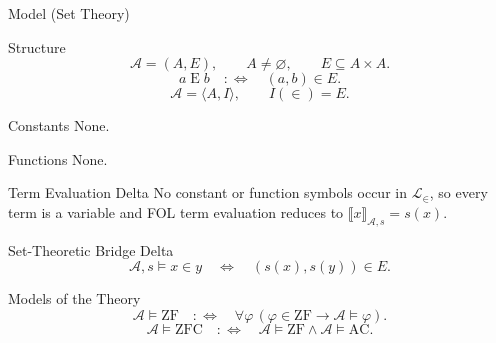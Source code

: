 \documentclass[12pt, a4paper]{report}
\begin{document}
\begin{modelbox}{Model (Set Theory)}
\begin{model}\label{model:set-theory}

\begin{modelcomponent}{Structure}
\[
  \mathcal A=(A,E),
  \qquad
  A\neq\varnothing,
  \qquad
  E\subseteq A\times A.
\]
\[
  a\mathrel E b
  \quad:\Longleftrightarrow\quad
  (a,b)\in E.
\]
\[
  \mathcal A=\langle A,I\rangle,
  \qquad
  I(\in)=E.
\]
\end{modelcomponent}

\begin{modelsorts}
\end{modelsorts}

\begin{modelcomponent}{Constants}
None.
\end{modelcomponent}

\begin{modelcomponent}{Functions}
None.
\end{modelcomponent}

\begin{modelrelations}
\end{modelrelations}

\begin{modelcomponent}{Term Evaluation Delta}
No constant or function symbols occur in \(\mathcal L_{\in}\), so every term is
a variable and FOL term evaluation reduces to \(\llbracket x\rrbracket_{\mathcal A,s}=s(x)\).
\end{modelcomponent}

\begin{modelcomponent}{Set-Theoretic Bridge Delta}
\[
    \mathcal A,s\models x\in y
    \quad\Longleftrightarrow\quad
    (s(x),s(y))\in E.
  \]
\end{modelcomponent}

\begin{modelcomponent}{Models of the Theory}
\[
    \mathcal A\models\mathrm{ZF}
    \quad:\Longleftrightarrow\quad
    \forall\varphi\,(\varphi\in\mathrm{ZF}\to\mathcal A\models\varphi).
\]
\[
    \mathcal A\models\mathrm{ZFC}
    \quad:\Longleftrightarrow\quad
    \mathcal A\models\mathrm{ZF}\wedge\mathcal A\models\mathrm{AC}.
\]
\end{modelcomponent}

\begin{modelconsequences}
  \modelconsequence{\[
    \mathrm{Th}(\mathcal A)=\{\sigma:\mathcal A\models\sigma\}.
  \]}
\end{modelconsequences}
\end{model}
\end{modelbox}
\end{document}
